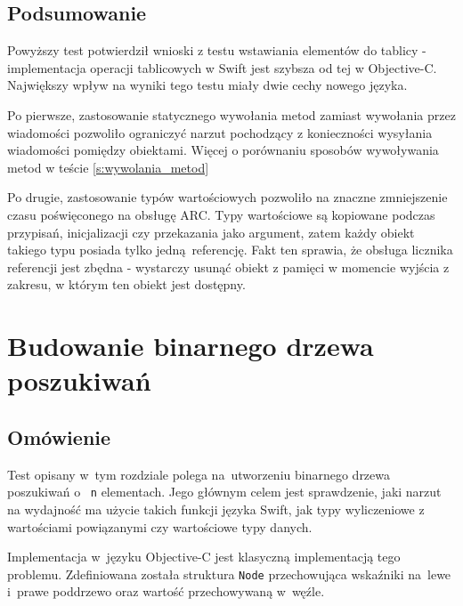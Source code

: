 \documentclass[mgr, shortabstract]{iithesis}
\newcommand{\swiftinline}[1]{
    \texttt{#1}
}
\newcommand{\objcinline}[1]{
    \texttt{#1}
}
\begin{document}
\subsection{Podsumowanie}

Powyższy test potwierdził wnioski z testu wstawiania elementów do tablicy - implementacja operacji tablicowych w Swift jest szybsza od tej w Objective-C. Największy wpływ na wyniki tego testu miały dwie cechy nowego języka.

Po pierwsze, zastosowanie statycznego wywołania metod zamiast wywołania przez wiadomości pozwoliło ograniczyć narzut pochodzący z konieczności wysyłania wiadomości pomiędzy obiektami. Więcej o porównaniu sposobów wywoływania metod w teście \ref{s:wywolania_metod}

Po drugie, zastosowanie typów wartościowych pozwoliło na znaczne zmniejszenie czasu poświęconego na obsługę ARC. Typy wartościowe są kopiowane podczas przypisań, inicjalizacji czy przekazania jako argument, zatem każdy obiekt takiego typu posiada tylko jedną referencję. Fakt ten sprawia, że obsługa licznika referencji jest zbędna - wystarczy usunąć obiekt z pamięci w momencie wyjścia z zakresu, w którym ten obiekt jest dostępny.

\section{Budowanie binarnego drzewa poszukiwań}

\subsection{Omówienie}

Test opisany w~tym rozdziale polega na~utworzeniu binarnego drzewa poszukiwań o~\swiftinline{n} elementach. Jego głównym celem jest sprawdzenie, jaki narzut na wydajność ma użycie takich funkcji języka Swift, jak typy wyliczeniowe z wartościami powiązanymi czy wartościowe typy danych.

Implementacja w~języku Objective-C jest klasyczną implementacją tego problemu. Zdefiniowana została struktura \objcinline{Node} przechowująca wskaźniki na~lewe i~prawe poddrzewo oraz wartość przechowywaną w~węźle.
\end{document}
